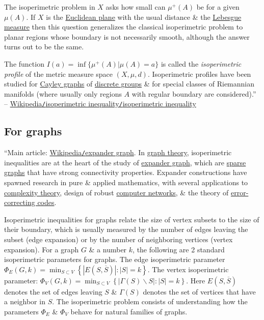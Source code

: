 \documentclass[oneside]{book}
\numberwithin{equation}{section}
\begin{document}
The isoperimetric problem in $X$ asks how small can $\mu^+(A)$ be for a given $\mu(A)$. If $X$ is the \href{https://en.wikipedia.org/wiki/Plane_(mathematics)}{Euclidean plane} with the usual distance \& the \href{https://en.wikipedia.org/wiki/Lebesgue_measure}{Lebesgue measure} then this question generalizes the classical isoperimetric problem to planar regions whose boundary is not necessarily smooth, although the answer turns out to be the same.

The function $I(a) = \inf\{\mu^+(A)|\mu(A) = a\}$ is called the \textit{isoperimetric profile} of the metric measure space $(X,\mu,d)$. Isoperimetric profiles have been studied for \href{https://en.wikipedia.org/wiki/Cayley_graph}{Cayley graphs} of \href{https://en.wikipedia.org/wiki/Discrete_group}{discrete groups} \& for special classes of Riemannian manifolds (where usually only regions $A$ with regular boundary are considered).'' -- \href{https://en.wikipedia.org/wiki/Isoperimetric_inequality#In_a_metric_measure_space}{Wikipedia\texttt{/}isoperimetric inequality\texttt{/}isoperimetric inequality}

\subsection{For graphs}
``Main article: \href{https://en.wikipedia.org/wiki/Expander_graph}{Wikipedia\texttt{/}expander graph}. In \href{https://en.wikipedia.org/wiki/Graph_theory}{graph theory}, isoperimetric inequalities are at the heart of the study of \href{https://en.wikipedia.org/wiki/Expander_graphs}{expander graph}, which are \href{https://en.wikipedia.org/wiki/Sparse_graph}{sparse graphs} that have strong connectivity properties. Expander constructions have spawned research in pure \& applied mathematics, with several applications to \href{https://en.wikipedia.org/wiki/Computational_complexity_theory}{complexity theory}, design of robust \href{https://en.wikipedia.org/wiki/Computer_network}{computer networks}, \& the theory of \href{https://en.wikipedia.org/wiki/Error-correcting_code}{error-correcting codes}.

Isoperimetric inequalities for graphs relate the size of vertex subsets to the size of their boundary, which is usually measured by the number of edges leaving the subset (edge expansion) or by the number of neighboring vertices (vertex expansion). For a graph $G$ \& a number $k$, the following are 2 standard isoperimetric parameters for graphs. The edge isoperimetric parameter $\Phi_E(G,k) = \min_{S\subset V} \left\{|E(S,\overline{S})|:|S| = k\right\}$. The vertex isoperimetric parameter: $\Phi_V(G,k) = \min_{S\subset V} \left\{|\Gamma(S)\backslash S|:|S| = k\right\}$. Here $E(S,\overline{S})$ denotes the set of edges leaving $S$ \& $\Gamma(S)$ denotes the set of vertices that have a neighbor in $S$. The isoperimetric problem consists of understanding how the parameters $\Phi_E$ \& $\Phi_V$ behave for natural families of graphs.
\end{document}
